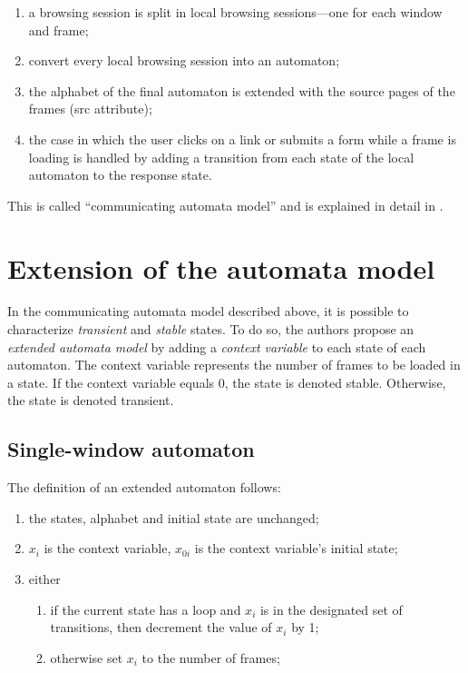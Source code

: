 \documentclass[a4paper,10pt]{article}
\theoremstyle{plain} %
\theoremstyle{definition}
\theoremstyle{remark}
\begin{document}
\begin{enumerate}
  \item a browsing session is split in local browsing sessions---one for each window and frame;
  \item convert every local browsing session into an automaton;
  \item the alphabet of the final automaton is extended with the source pages of the frames (src attribute);
  \item the case in which the user clicks on a link or submits a form while a frame is loading is handled by adding a transition from each state of the local automaton to the response state.
\end{enumerate}

This is called ``communicating automata model'' and is explained in detail in \cite{Haydar2004}.

\section{Extension of the automata model}

In the communicating automata model described above, it is possible to characterize \textit{transient} and \textit{stable} states. To do so, the authors propose an \textit{extended automata model} by adding a \textit{context variable} to each state of each automaton. The context variable represents the number of frames to be loaded in a state. If the context variable equals 0, the state is denoted stable. Otherwise, the state is denoted transient.

\subsection{Single-window automaton}

The definition of an extended automaton follows:

\begin{enumerate}
  \item the states, alphabet and initial state are unchanged;
  \item $x_i$ is the context variable, $x_{0i}$ is the context variable's initial state;
  \item either
    \begin{enumerate}
      \item if the current state has a loop and $x_i$ is in the designated set of transitions, then decrement the value of $x_i$ by 1;
      \item otherwise set $x_i$ to the number of frames;
    \end{enumerate}
\end{enumerate}
\end{document}
